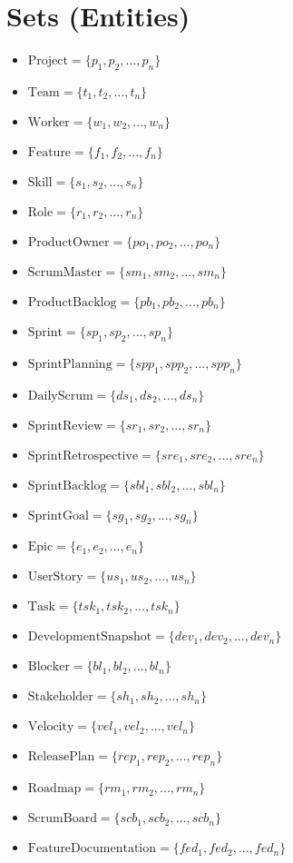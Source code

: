 \documentclass[11pt]{article}
\begin{document}
\section{Sets (Entities)}
\begin{itemize}
    \item $\text{Project} = \{p_1, p_2, ..., p_n\}$
    \item $\text{Team} = \{t_1, t_2, ..., t_n\}$
    \item $\text{Worker} = \{w_1, w_2, ..., w_n\}$
    \item $\text{Feature} = \{f_1, f_2, ..., f_n\}$
    \item $\text{Skill} = \{s_1, s_2, ..., s_n\}$
    \item $\text{Role} = \{r_1, r_2, ..., r_n\}$
    \item $\text{ProductOwner} = \{po_1, po_2, ..., po_n\}$
    \item $\text{ScrumMaster} = \{sm_1, sm_2, ..., sm_n\}$
    \item $\text{ProductBacklog} = \{pb_1, pb_2, ..., pb_n\}$
    \item $\text{Sprint} = \{sp_1, sp_2, ..., sp_n\}$
    \item $\text{SprintPlanning} = \{spp_1, spp_2, ..., spp_n\}$
    \item $\text{DailyScrum} = \{ds_1, ds_2, ..., ds_n\}$
    \item $\text{SprintReview} = \{sr_1, sr_2, ..., sr_n\}$
    \item $\text{SprintRetrospective} = \{sre_1, sre_2, ..., sre_n\}$
    \item $\text{SprintBacklog} = \{sbl_1, sbl_2, ..., sbl_n\}$
    \item $\text{SprintGoal} = \{sg_1, sg_2, ..., sg_n\}$
    \item $\text{Epic} = \{e_1, e_2, ..., e_n\}$
    \item $\text{UserStory} = \{us_1, us_2, ..., us_n\}$
    \item $\text{Task} = \{tsk_1, tsk_2, ..., tsk_n\}$
    \item $\text{DevelopmentSnapshot} = \{dev_1, dev_2, ..., dev_n\}$
    \item $\text{Blocker} = \{bl_1, bl_2, ..., bl_n\}$
    \item $\text{Stakeholder} = \{sh_1, sh_2, ..., sh_n\}$
    \item $\text{Velocity} = \{vel_1, vel_2, ..., vel_n\}$
    \item $\text{ReleasePlan} = \{rep_1, rep_2, ..., rep_n\}$
    \item $\text{Roadmap} = \{rm_1, rm_2, ..., rm_n\}$
    \item $\text{ScrumBoard} = \{scb_1, scb_2, ..., scb_n\}$
    \item $\text{FeatureDocumentation} = \{fed_1, fed_2, ..., fed_n\}$
\end{itemize}
\end{document}
